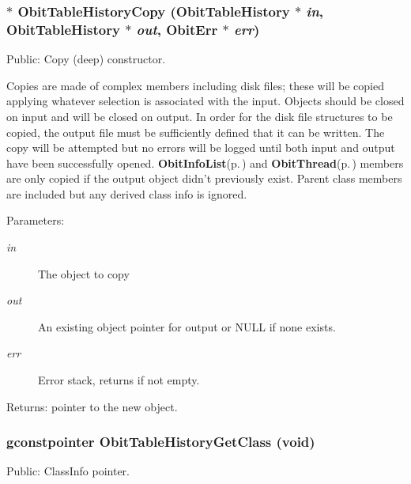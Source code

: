 \subsubsection{$\ast$ Obit\-Table\-History\-Copy ({\bf Obit\-Table\-History} $\ast$ {\em in}, {\bf Obit\-Table\-History} $\ast$ {\em out}, {\bf Obit\-Err} $\ast$ {\em err})}\label{ObitTableHistory_8h_a14}


Public: Copy (deep) constructor. 

Copies are made of complex members including disk files; these will be copied applying whatever selection is associated with the input. Objects should be closed on input and will be closed on output. In order for the disk file structures to be copied, the output file must be sufficiently defined that it can be written. The copy will be attempted but no errors will be logged until both input and output have been successfully opened. {\bf Obit\-Info\-List}{\rm (p.\,\pageref{structObitInfoList})} and {\bf Obit\-Thread}{\rm (p.\,\pageref{structObitThread})} members are only copied if the output object didn't previously exist. Parent class members are included but any derived class info is ignored. \begin{Desc}
\item[Parameters:]
\begin{description}
\item[{\em in}]The object to copy \item[{\em out}]An existing object pointer for output or NULL if none exists. \item[{\em err}]Error stack, returns if not empty. \end{description}
\end{Desc}
\begin{Desc}
\item[Returns:]pointer to the new object. \end{Desc}
\subsubsection{\setlength{\rightskip}{0pt plus 5cm}gconstpointer Obit\-Table\-History\-Get\-Class (void)}\label{ObitTableHistory_8h_a13}


Public: Class\-Info pointer. 

